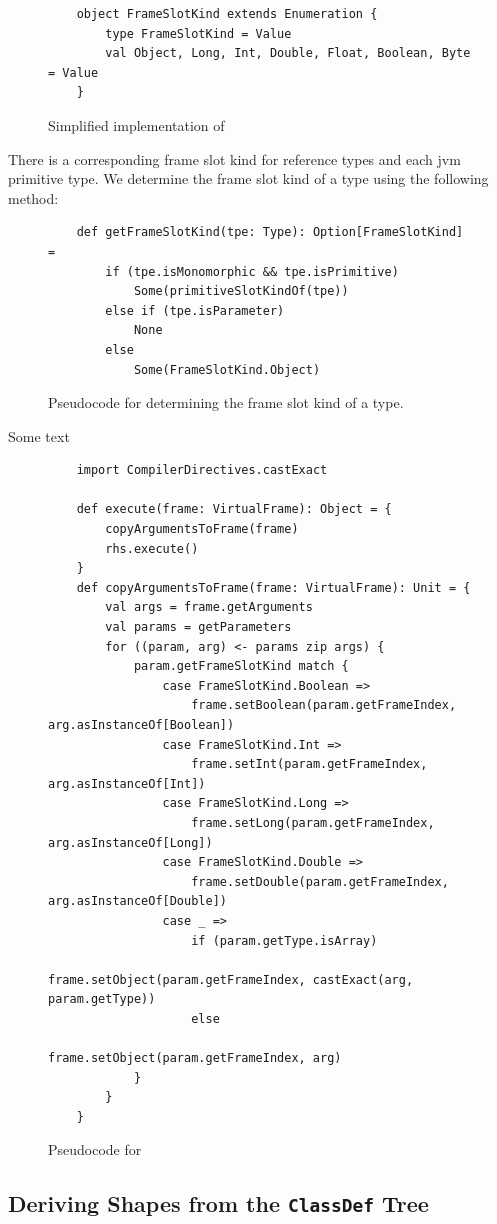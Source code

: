 \begin{figure}[!htb]
	\begin{verbatim}
	object FrameSlotKind extends Enumeration {
		type FrameSlotKind = Value
		val Object, Long, Int, Double, Float, Boolean, Byte = Value
	}
	\end{verbatim}
	\caption{Simplified implementation of }
\end{figure}

There is a corresponding frame slot kind for reference types and each \acrshort{jvm} primitive type. 
We determine the frame slot kind of a type using the following method:

\begin{figure}[!htb]
	\begin{verbatim}
	def getFrameSlotKind(tpe: Type): Option[FrameSlotKind] = 
		if (tpe.isMonomorphic && tpe.isPrimitive) 
			Some(primitiveSlotKindOf(tpe))
		else if (tpe.isParameter) 
			None
		else 
			Some(FrameSlotKind.Object)
	\end{verbatim}
	\caption{Pseudocode for determining the frame slot kind of a type.}
\end{figure}

Some text 

\begin{figure}
	\begin{verbatim}
	import CompilerDirectives.castExact 
			
	def execute(frame: VirtualFrame): Object = {
		copyArgumentsToFrame(frame)
		rhs.execute()
	}	
	def copyArgumentsToFrame(frame: VirtualFrame): Unit = {
		val args = frame.getArguments
		val params = getParameters
		for ((param, arg) <- params zip args) {
			param.getFrameSlotKind match {
				case FrameSlotKind.Boolean =>
					frame.setBoolean(param.getFrameIndex, arg.asInstanceOf[Boolean])
				case FrameSlotKind.Int =>
					frame.setInt(param.getFrameIndex, arg.asInstanceOf[Int])
				case FrameSlotKind.Long =>
					frame.setLong(param.getFrameIndex, arg.asInstanceOf[Long])
				case FrameSlotKind.Double =>
					frame.setDouble(param.getFrameIndex, arg.asInstanceOf[Double])
				case _ =>
					if (param.getType.isArray)
						frame.setObject(param.getFrameIndex, castExact(arg, param.getType))
					else
						frame.setObject(param.getFrameIndex, arg)
			}
		}
	}	
	\end{verbatim}

\caption{Pseudocode for }
\end{figure}

\subsection{Deriving Shapes from the \texttt{ClassDef} Tree}
\label{impl:subsection:classdef}

